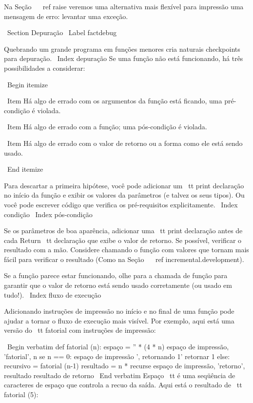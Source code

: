 \documentclass[10pt]{book}
\begin{document}
\begin {itemize}
{{{{Na Seção ~ \ ref {} raise veremos uma alternativa mais flexível para impressão
uma mensagem de erro: levantar uma exceção.


\ Section {} Depuração
\ Label {} factdebug

Quebrando um grande programa em funções menores cria naturais
checkpoints para depuração. \ Index {depuração}
Se uma função não está funcionando, há
três possibilidades a considerar:

\ Begin {itemize}

\ Item Há algo de errado com os argumentos da função
está ficando, uma pré-condição é violada.

\ Item Há algo de errado com a função; uma pós-condição
é violada.

\ Item Há algo de errado com o valor de retorno ou a
forma como ele está sendo usado.

\ End {itemize}

Para descartar a primeira hipótese, você pode adicionar um {\ tt print} declaração
no início da função e exibir os valores da
parâmetros (e talvez os seus tipos). Ou você pode escrever código
que verifica os pré-requisitos explicitamente.
\ Index {condição}
\ Index {pós-condição}

Se os parâmetros de boa aparência, adicionar uma {\ tt print} declaração antes de cada
{Return \ tt} declaração que exibe o valor de retorno. Se
possível, verificar o resultado com a mão. Considere chamando o
função com valores que tornam mais fácil para verificar o resultado
(Como na Seção ~ \ ref {incremental.development}).

Se a função parece estar funcionando, olhe para a chamada de função
para garantir que o valor de retorno está sendo usado corretamente (ou usado
em tudo!).
\ Index {fluxo de execução}

Adicionando instruções de impressão no início e no final de uma função
pode ajudar a tornar o fluxo de execução mais visível.
Por exemplo, aqui está uma versão do {\ tt fatorial} com
instruções de impressão:

\ Begin {verbatim}
def fatorial (n):
    espaço = '' * (4 * n)
    espaço de impressão, 'fatorial', n
    se n == 0:
        espaço de impressão ', retornando 1'
        retornar 1
    else:
        recursivo = fatorial (n-1)
        resultado = n * recurse
        espaço de impressão, 'retorno', resultado
        resultado de retorno
\ End {verbatim}
%
{Espaço \ tt} é uma seqüência de caracteres de espaço que controla a
recuo da saída. Aqui está o resultado de {\ tt fatorial (5)}:

}}}}
\end{itemize}
\end{document}

